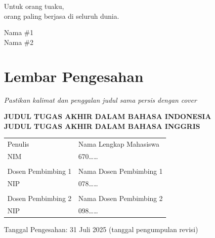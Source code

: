 \documentclass[a4paper,11pt,oneside]{report}
\begin{document}
\begin{center}
    Untuk orang tuaku,\\
    orang paling berjasa di seluruh dunia.
\end{center}

\vspace{3cm}
\begin{flushleft}
    Nama \#1\\
    Nama \#2
\end{flushleft}

\chapter*{Lembar Pengesahan}

\noindent\textit{Pastikan kalimat dan penggalan judul sama persis dengan cover}

\begin{center}
    {\bfseries JUDUL TUGAS AKHIR DALAM BAHASA INDONESIA}\\[6pt]
    {\bfseries JUDUL TUGAS AKHIR DALAM BAHASA INGGRIS}
\end{center}

\vspace{1cm}
\begin{table}[h]
    \centering
    \begin{tabular}{p{4cm}p{8cm}}
        Penulis                 & Nama Lengkap Mahasiswa \\
        NIM                     & 670\ldots\ldots \\
        \multicolumn{2}{c}{} \\
        Dosen Pembimbing 1      & Nama Dosen Pembimbing 1 \\
        NIP                     & 078\ldots\ldots \\
        \multicolumn{2}{c}{} \\
        Dosen Pembimbing 2      & Nama Dosen Pembimbing 2 \\
        NIP                     & 098\ldots\ldots \\
    \end{tabular}
\end{table}

\vspace{2cm}
\begin{center}
    Tanggal Pengesahan: 31 Juli 2025 (tanggal pengumpulan revisi)
\end{center}
\end{document}
